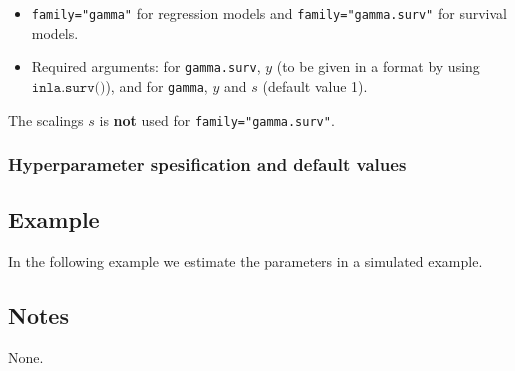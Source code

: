 \documentclass[a4paper,11pt]{article}
\begin{document}
\begin{itemize}
\item \texttt{family="gamma"} for regression models and
    \texttt{family="gamma.surv"} for survival models.
\item Required arguments: for \texttt{gamma.surv}, $y$ (to be given in
    a format by using $\texttt{inla.surv()}$), and for \texttt{gamma},
    $y$ and $s$ (default value 1).
\end{itemize}
The scalings $s$ is \textbf{not} used for \texttt{family="gamma.surv"}.

\subsubsection*{Hyperparameter spesification and default values}




\subsection*{Example}

In the following example we estimate the parameters in a simulated
example.


\subsection*{Notes}

None.
\end{document}
